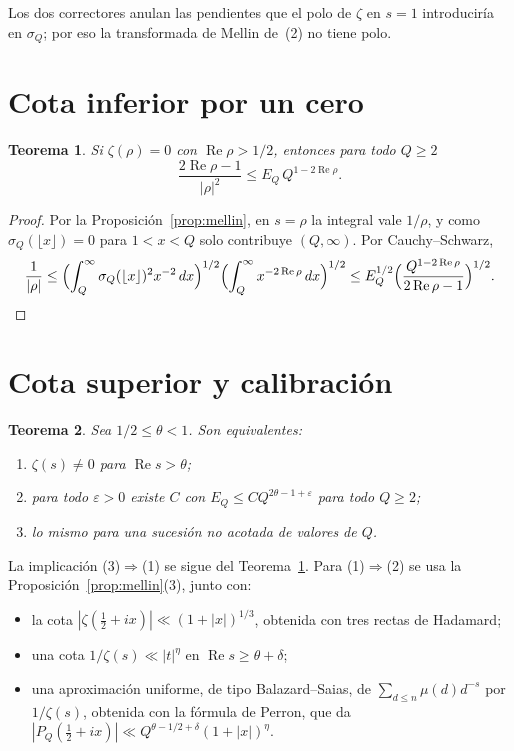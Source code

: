\documentclass[11pt,a4paper]{amsart}
\newtheorem{teorema}{Teorema}
\theoremstyle{definition}
\theoremstyle{remark}
\renewcommand{\Re}{\operatorname{Re}}
\begin{document}
Los dos correctores anulan las pendientes que el polo de $\zeta$ en $s=1$ introducir\'ia en $\sigma_Q$; por eso la transformada de Mellin de~(2) no tiene polo.

\section{Cota inferior por un cero}

\begin{teorema}\label{teo:recip}
Si $\zeta(\rho)=0$ con $\Re\rho>1/2$, entonces para todo $Q\ge2$
\[
\frac{2\Re\rho-1}{|\rho|^2}\le E_Q\,Q^{1-2\Re\rho}.
\]
\end{teorema}

\begin{proof}
Por la Proposici\'on~\ref{prop:mellin}, en $s=\rho$ la integral vale $1/\rho$, y como $\sigma_Q(\lfloor x\rfloor)=0$ para $1<x<Q$ solo contribuye $(Q,\infty)$. Por Cauchy--Schwarz,
\[
\frac1{|\rho|}\le\Bigl(\int_Q^\infty\sigma_Q(\lfloor x\rfloor)^2x^{-2}\,dx\Bigr)^{1/2}\Bigl(\int_Q^\infty x^{-2\Re\rho}\,dx\Bigr)^{1/2}
\le E_Q^{1/2}\Bigl(\frac{Q^{1-2\Re\rho}}{2\Re\rho-1}\Bigr)^{1/2}.\qedhere
\]
\end{proof}

\section{Cota superior y calibraci\'on}\label{sec:cotas}

\begin{teorema}\label{teo:theta}
Sea $1/2\le\theta<1$. Son equivalentes:
\begin{enumerate}
\item $\zeta(s)\ne0$ para $\Re s>\theta$;
\item para todo $\varepsilon>0$ existe $C$ con $E_Q\le CQ^{2\theta-1+\varepsilon}$ para todo $Q\ge2$;
\item lo mismo para una sucesi\'on no acotada de valores de $Q$.
\end{enumerate}
\end{teorema}

La implicaci\'on (3)$\Rightarrow$(1) se sigue del Teorema~\ref{teo:recip}. Para (1)$\Rightarrow$(2) se usa la Proposici\'on~\ref{prop:mellin}(3), junto con:
\begin{itemize}
\item la cota $|\zeta(\tfrac12+ix)|\ll(1+|x|)^{1/3}$, obtenida con tres rectas de Hadamard;
\item una cota $1/\zeta(s)\ll|t|^\eta$ en $\Re s\ge\theta+\delta$;
\item una aproximaci\'on uniforme, de tipo Balazard--Saias, de $\sum_{d\le n}\mu(d)d^{-s}$ por $1/\zeta(s)$, obtenida con la f\'ormula de Perron, que da $|P_Q(\tfrac12+ix)|\ll Q^{\theta-1/2+\delta}(1+|x|)^\eta$.
\end{itemize}
\end{document}

